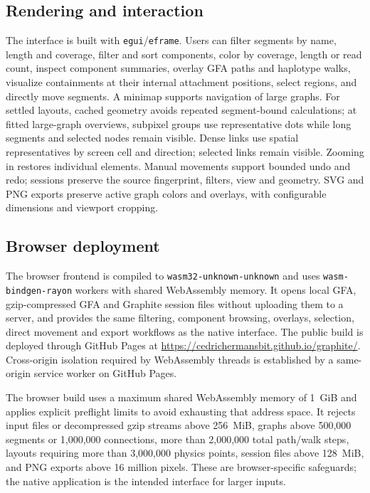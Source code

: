 \documentclass[11pt]{article}
\begin{document}
\subsection{Rendering and interaction}
The interface is built with \texttt{egui}/\texttt{eframe}. Users can filter segments by name, length and coverage, filter and sort components, color by coverage, length or read count, inspect component summaries, overlay GFA paths and haplotype walks, visualize containments at their internal attachment positions, select regions, and directly move segments. A minimap supports navigation of large graphs. For settled layouts, cached geometry avoids repeated segment-bound calculations; at fitted large-graph overviews, subpixel groups use representative dots while long segments and selected nodes remain visible. Dense links use spatial representatives by screen cell and direction; selected links remain visible. Zooming in restores individual elements. Manual movements support bounded undo and redo; sessions preserve the source fingerprint, filters, view and geometry. SVG and PNG exports preserve active graph colors and overlays, with configurable dimensions and viewport cropping.

\subsection{Browser deployment}
The browser frontend is compiled to \texttt{wasm32-unknown-unknown} and uses \texttt{wasm-bindgen-rayon} workers with shared WebAssembly memory. It opens local GFA, gzip-compressed GFA and Graphite session files without uploading them to a server, and provides the same filtering, component browsing, overlays, selection, direct movement and export workflows as the native interface. The public build is deployed through GitHub Pages at \url{https://cedrichermansbit.github.io/graphite/}. Cross-origin isolation required by WebAssembly threads is established by a same-origin service worker on GitHub Pages.

The browser build uses a maximum shared WebAssembly memory of 1~GiB and applies explicit preflight limits to avoid exhausting that address space. It rejects input files or decompressed gzip streams above 256~MiB, graphs above 500,000 segments or 1,000,000 connections, more than 2,000,000 total path/walk steps, layouts requiring more than 3,000,000 physics points, session files above 128~MiB, and PNG exports above 16 million pixels. These are browser-specific safeguards; the native application is the intended interface for larger inputs.
\end{document}
